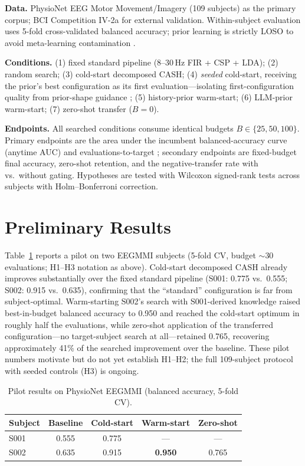 \documentclass[conference]{IEEEtran}
\begin{document}
\textbf{Data.} PhysioNet EEG Motor Movement/Imagery (109 subjects) as the primary corpus; BCI Competition IV-2a for external validation. Within-subject evaluation uses 5-fold cross-validated balanced accuracy; prior learning is strictly LOSO to avoid meta-learning contamination \cite{EggenspergerEtAl2021}.

\textbf{Conditions.} (1) fixed standard pipeline (8--30\,Hz FIR + CSP + LDA); (2) random search; (3) cold-start decomposed CASH; (4) \emph{seeded} cold-start, receiving the prior's best configuration as its first evaluation---isolating first-configuration quality from prior-shape guidance \cite{RodriguesEtAl2026}; (5) history-prior warm-start; (6) LLM-prior warm-start; (7) zero-shot transfer ($B{=}0$).

\textbf{Endpoints.} All searched conditions consume identical budgets $B\in\{25,50,100\}$. Primary endpoints are the area under the incumbent balanced-accuracy curve (anytime AUC) and evaluations-to-target \cite{GijsbersEtAl2019}; secondary endpoints are fixed-budget final accuracy, zero-shot retention, and the negative-transfer rate with vs.\ without gating. Hypotheses are tested with Wilcoxon signed-rank tests across subjects with Holm--Bonferroni correction.

\section{Preliminary Results}
\label{sec:results}

Table~\ref{tab:pilot} reports a pilot on two EEGMMI subjects (5-fold CV, budget ${\sim}30$ evaluations; H1--H3 notation as above). Cold-start decomposed CASH already improves substantially over the fixed standard pipeline (S001: 0.775 vs.\ 0.555; S002: 0.915 vs.\ 0.635), confirming that the ``standard'' configuration is far from subject-optimal. Warm-starting S002's search with S001-derived knowledge raised best-in-budget balanced accuracy to 0.950 and reached the cold-start optimum in roughly half the evaluations, while zero-shot application of the transferred configuration---no target-subject search at all---retained 0.765, recovering approximately 41\% of the searched improvement over the baseline. These pilot numbers motivate but do not yet establish H1--H2; the full 109-subject protocol with seeded controls (H3) is ongoing.

\begin{table}[t]
\caption{Pilot results on PhysioNet EEGMMI (balanced accuracy, 5-fold CV).}
\label{tab:pilot}
\centering
\begin{tabular}{lcccc}
\toprule
Subject & Baseline & Cold-start & Warm-start & Zero-shot \\
\midrule
S001 & 0.555 & 0.775 & --- & --- \\
S002 & 0.635 & 0.915 & \textbf{0.950} & 0.765 \\
\bottomrule
\end{tabular}
\end{table}
\end{document}
